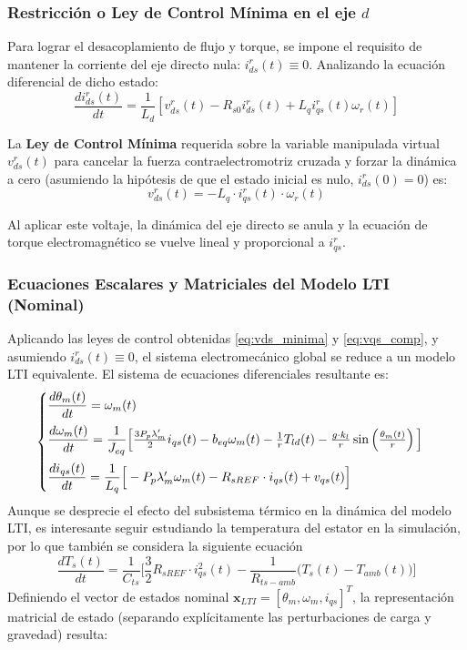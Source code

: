 \documentclass[12pt, a4paper,journal, onecolumn, compsoc]{IEEEtran}
\begin{document}
\subsubsection{Restricción o Ley de Control Mínima en el eje $d$}
Para lograr el desacoplamiento de flujo y torque, se impone el requisito de mantener la corriente del eje directo nula: $i_{ds}^r(t) \equiv 0$. Analizando la ecuación diferencial de dicho estado:
\begin{equation}
    \frac{di_{ds}^r(t)}{dt} = \frac{1}{L_d} \left[ v_{ds}^r(t) - R_{s0} i_{ds}^r(t) + L_q i_{qs}^r(t) \omega_r(t) \right]
\end{equation}

La \textbf{Ley de Control Mínima} requerida sobre la variable manipulada virtual $v_{ds}^r(t)$ para cancelar la fuerza contraelectromotriz cruzada y forzar la dinámica a cero (asumiendo la hipótesis de que el estado inicial es nulo, $i_{ds}^r(0) = 0$) es:
\begin{equation} \label{eq:vds_minima}
    v_{ds}^r(t) = -L_q \cdot i_{qs}^r(t) \cdot \omega_r(t)
\end{equation}

Al aplicar este voltaje, la dinámica del eje directo se anula y la ecuación de torque electromagnético se vuelve lineal y proporcional a $i_{qs}^r$.

\subsubsection{Ecuaciones Escalares y Matriciales del Modelo LTI (Nominal)}
Aplicando las leyes de control obtenidas \eqref{eq:vds_minima} y \eqref{eq:vqs_comp}, y asumiendo $i_{ds}^r(t) \equiv 0$, el sistema electromecánico global se reduce a un modelo LTI equivalente. El sistema de ecuaciones diferenciales resultante es:
\begin{equation} \label{eq:sis_escalar_LTI}
\begin{cases}
    \vspace{0.2cm}
    \dfrac{d\theta_m(t)}{dt} = \omega_m(t) \\
    \vspace{0.2cm}
    \dfrac{d\omega_m(t)}{dt} = \dfrac{1}{J_{eq}}\Big[\frac{3 P_p \lambda'_m}{2} i_{qs}(t) - b_{eq} \omega_m(t) - \frac{1}{r} T_{ld}(t) - \frac{g\cdot k_l}{r} \sin\left(\frac{\theta_m(t)}{r}\right)\Big] \\
    \dfrac{di_{qs}(t)}{dt} = \dfrac{1}{L_q}\Big[-P_p \lambda'_m \omega_m(t) - R_{sREF}\cdot i_{qs}(t) + v_{qs}(t)\Big]
\end{cases}
\end{equation}
Aunque se desprecie el efecto del subsistema térmico en la dinámica del modelo LTI, es interesante seguir estudiando la temperatura del estator en la simulación, por lo que también se considera la siguiente ecuación
\[\dfrac{dT_s(t)}{dt} = \dfrac{1}{C_{ts}}\Big[\frac{3}{2}R_{sREF}\cdot i_{qs}^2(t)-\frac{1}{R_{ts-amb}}\big(T_s(t) - T_{amb}(t)\big)\Big]\]
Definiendo el vector de estados nominal $\mathbf{x}_{LTI} = [\theta_m, \omega_m, i_{qs}]^T$, la representación matricial de estado (separando explícitamente las perturbaciones de carga y gravedad) resulta:
\end{document}
